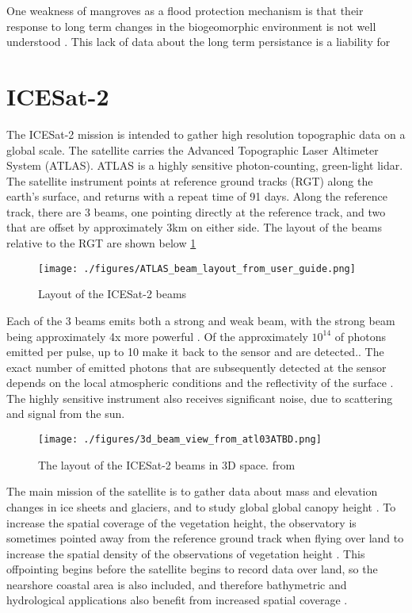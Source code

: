 One weakness of mangroves as a flood protection mechanism is that their response to long term changes in the biogeomorphic environment is not well understood \parencite{Gijsman2021}. This lack of data about the long term persistance is a liability for

\section{ICESat-2}

The ICESat-2 mission is intended to gather high resolution topographic data on a global scale. The satellite carries the Advanced Topographic Laser Altimeter System (ATLAS). ATLAS is a highly sensitive photon-counting, green-light lidar. The satellite instrument points at reference ground tracks (RGT) along the earth's surface, and returns with a repeat time of 91 days. Along the reference track, there are 3 beams, one pointing directly at the reference track, and two that are offset by approximately 3km on either side. The layout of the beams relative to the RGT are shown below \ref{icesat-rgts}

\begin{figure}
      \centering
      \label{icesat-rgts}
      \texttt{[image: ./figures/ATLAS\_beam\_layout\_from\_user\_guide.png]}
      \caption{Layout of the ICESat-2 beams}
\end{figure}

Each of the 3 beams emits both a strong and weak beam, with the strong beam being approximately 4x more powerful \parencite{Neumann2019d}. Of the approximately \(10^{14}\) of photons emitted per pulse, up to  10 make it back to the sensor and are detected.\parencite{Neumann2019d}. The exact number of emitted photons that are subsequently detected at the sensor depends on the local atmospheric conditions and the reflectivity of the surface \parencite{Neumann2019e}. The highly sensitive instrument also receives significant noise, due to scattering and signal from the sun.


\begin{figure}[htbp]
      \centering
      \texttt{[image: ./figures/3d\_beam\_view\_from\_atl03ATBD.png]}
      \caption{The layout of the ICESat-2 beams in 3D space. from \cite{Neumann2019d}}
      \label{3d-beams}
\end{figure}


The main mission of the satellite is to gather data about mass and elevation changes in ice sheets and glaciers, and to study global global canopy height \parencite{Markus2017}. To increase the spatial coverage of the vegetation height, the observatory is sometimes pointed away from the reference ground track when flying over land to increase the spatial density of the observations of vegetation height \parencite{Markus2017}. This offpointing begins before the satellite begins to record data over land, so the nearshore coastal area is also included, and therefore bathymetric and hydrological applications also benefit from increased spatial coverage \parencite{Magruder2021}.

